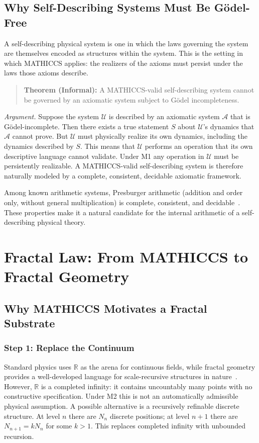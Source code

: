 \documentclass[11pt,a4paper]{article}
\begin{document}
\subsection{Why Self-Describing Systems Must Be G\"odel-Free}

A self-describing physical system is one in which the laws governing the system are themselves encoded as structures within the system. This is the setting in which MATHICCS applies: the realizers of the axioms must persist under the laws those axioms describe.

\begin{quote}
\textbf{Theorem (Informal):} A MATHICCS-valid self-describing system cannot be governed by an axiomatic system subject to G\"odel incompleteness.
\end{quote}

\textit{Argument.} Suppose the system $\mathcal{U}$ is described by an axiomatic system $\mathcal{A}$ that is G\"odel-incomplete. Then there exists a true statement $S$ about $\mathcal{U}$'s dynamics that $\mathcal{A}$ cannot prove. But $\mathcal{U}$ must physically realize its own dynamics, including the dynamics described by $S$. This means that $\mathcal{U}$ performs an operation that its own descriptive language cannot validate. Under M1 any operation in $\mathcal{U}$ must be persistently realizable. A MATHICCS-valid self-describing system is therefore naturally modeled by a complete, consistent, decidable axiomatic framework.

Among known arithmetic systems, Presburger arithmetic (addition and order only, without general multiplication) is complete, consistent, and decidable~\cite{Presburger1929}. These properties make it a natural candidate for the internal arithmetic of a self-describing physical theory.


\section{Fractal Law: From MATHICCS to Fractal Geometry}

\subsection{Why MATHICCS Motivates a Fractal Substrate}

\subsubsection{Step 1: Replace the Continuum}
Standard physics uses $\mathbb{R}$ as the arena for continuous fields, while fractal geometry provides a well-developed language for scale-recursive structures in nature~\cite{Mandelbrot1983,Nottale2011}. However, $\mathbb{R}$ is a completed infinity: it contains uncountably many points with no constructive specification. Under M2 this is not an automatically admissible physical assumption. A possible alternative is a recursively refinable discrete structure. At level $n$ there are $N_n$ discrete positions; at level $n+1$ there are $N_{n+1}=kN_n$ for some $k>1$. This replaces completed infinity with unbounded recursion.
\end{document}
